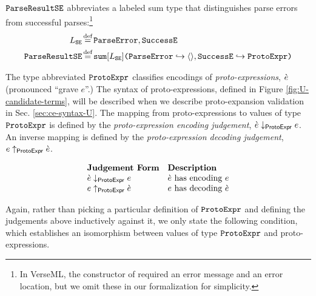 \begin{enumerate}
$\mathtt{ParseResultSE}$ abbreviates a labeled sum type that distinguishes parse errors from successful parses:\footnote{In VerseML, the  constructor of  required an error message and an error location, but we omit these in our formalization for simplicity.}
\begin{align*}
L_\mathtt{SE} & \defeq \lbltxt{ParseError}, \lbltxt{SuccessE}\\
\tParseResultExp & \defeq \asum{\labelset_\mathtt{SE}}{
  \mapitem{\lbltxt{ParseError}}{\prodt{}}, 
  \mapitem{\lbltxt{SuccessE}}{\tCEExp}
}
\end{align*} %

The type abbreviated $\mathtt{ProtoExpr}$ classifies encodings of \emph{proto-expressions}, $\grave{e}$ (pronounced ``grave $e$''.) The syntax of proto-expressions, defined in Figure \ref{fig:U-candidate-terms}, will be described when we describe proto-expansion validation in Sec. \ref{sec:ce-syntax-U}. The mapping from proto-expressions to values of type $\mathtt{ProtoExpr}$ is defined by the \emph{proto-expression encoding judgement}, $\grave{e} \downarrow_\mathsf{ProtoExpr} e$. An inverse mapping is defined by the \emph{proto-expression decoding judgement}, $e \uparrow_\mathsf{ProtoExpr} \grave{e}$.

\[\begin{array}{ll}
\textbf{Judgement Form} & \textbf{Description}\\
\grave{e} \downarrow_\mathsf{ProtoExpr} e & \text{$\grave{e}$ has encoding $e$}\\
e \uparrow_\mathsf{ProtoExpr} \grave{e} & \text{$e$ has decoding $\grave{e}$}
\end{array}\]

Again, rather than picking a particular definition of $\mathtt{ProtoExpr}$ and defining the judgements above inductively against it, we only state the following condition, which establishes an isomorphism between values of type $\mathtt{ProtoExpr}$ and proto-expressions.


\end{enumerate}
